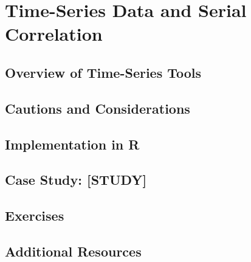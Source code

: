 
\chapter{Time-Series Data and Serial Correlation}

\section{Overview of Time-Series Tools}

\section{Cautions and Considerations}

\section{Implementation in R}

\section{Case Study: [STUDY]}

\section{Exercises}

\section{Additional Resources}
